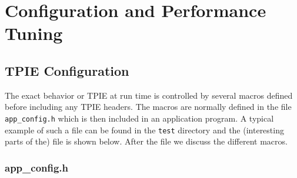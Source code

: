 \chapter{Configuration and Performance Tuning}
\label{sec:tuning}


\section{TPIE Configuration}
\label{sec:configuration}


The exact behavior or TPIE at run time is controlled by several macros
defined before including any TPIE headers. The macros are normally defined
in the file \verb|app_config.h| which is then included in an application
program. A typical example of such a file can be found in the \verb|test|
directory and the (interesting parts of the) file is shown below. After
the file we discuss the different macros.

\subsection{app\_config.h}

